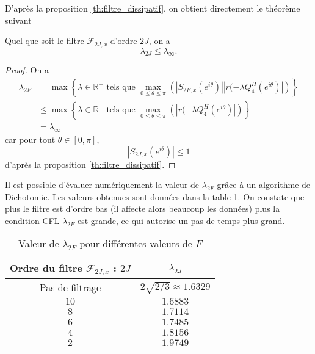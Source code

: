 D'après la proposition \ref{th:filtre_dissipatif}, on obtient directement le théorème suivant
\begin{theoreme}
Quel que soit le filtre $\mathcal{F}_{2J,x}$ d'ordre $2J$, on a 
\begin{equation}
\lambda_{2J} \leq \lambda_{\infty}.
\end{equation}
\end{theoreme}

\begin{proof}
On a 
\begin{align*}
\lambda_{2F} & = \max \left\lbrace \lambda \in \mathbb{R}^+ \text{ tels que } \max_{0 \leq \theta \leq \pi} \left(|S_{2F,x}(e^{i \theta})| | r(-\lambda Q_4^H(e^{i \theta}) | \right) \right\rbrace \\
		& \leq \max \left\lbrace \lambda \in \mathbb{R}^+ \text{ tels que } \max_{0 \leq \theta \leq \pi} \left(| r(-\lambda Q_4^H(e^{i \theta}) | \right) \right\rbrace\\
		& = \lambda_{\infty}
\end{align*}
car pour tout $\theta \in [0, \pi]$, 
\begin{equation}
|S_{2J,x}(e^{i \theta})| \leq 1
\end{equation}
d'après la proposition \ref{th:filtre_dissipatif}.
\end{proof}

Il est possible d'évaluer numériquement la valeur de $\lambda_{2F}$ grâce à un algorithme de Dichotomie. Les valeurs obtenues sont données dans la table \ref{tab:cfl_adv1d}. On constate que plus le filtre est d'ordre bas (il affecte alors beaucoup les données) plus la condition CFL $\lambda_{2F}$ est grande, ce qui autorise un pas de temps plus grand.

\begin{table}[htbp]
\begin{center}
\begin{tabular}{|c|c|}
\hline
\textbf{Ordre du filtre} $\mathcal{F}_{2J,x}$ : $2J$ & $\lambda_{2J}$ \\
\hline
\hline
Pas de filtrage & $2 \sqrt{2/3} \approx 1.6329$ \\
$10$ & $1.6883$ \\
$ 8$ & $1.7114$ \\
$ 6$ & $1.7485$ \\
$ 4$ & $1.8156$ \\
$ 2$ & $1.9749$ \\
\hline
\end{tabular}
\end{center}
\caption{Valeur de $\lambda_{2F}$ pour différentes valeurs de $F$}
\label{tab:cfl_adv1d}
\end{table}













